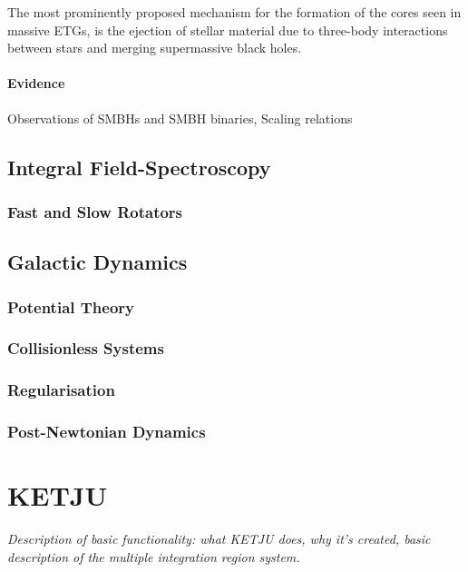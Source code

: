 \documentclass[english, oneside]{HYgradu}
\begin{document}
The most prominently proposed mechanism for the formation of the cores seen in massive ETGs, is the ejection of stellar material due to three-body interactions between stars and merging supermassive black holes.

\subsubsection{Evidence}

Observations of SMBHs and SMBH binaries, Scaling relations

\section{Integral Field-Spectroscopy}

\subsection{Fast and Slow Rotators}

\section{Galactic Dynamics}

\subsection{Potential Theory}

\subsection{Collisionless Systems}

\subsection{Regularisation}

\subsection{Post-Newtonian Dynamics}

\chapter{KETJU}

\textit{Description of basic functionality: what KETJU does, why it's created, basic description of the multiple integration region system.} 
\end{document}
